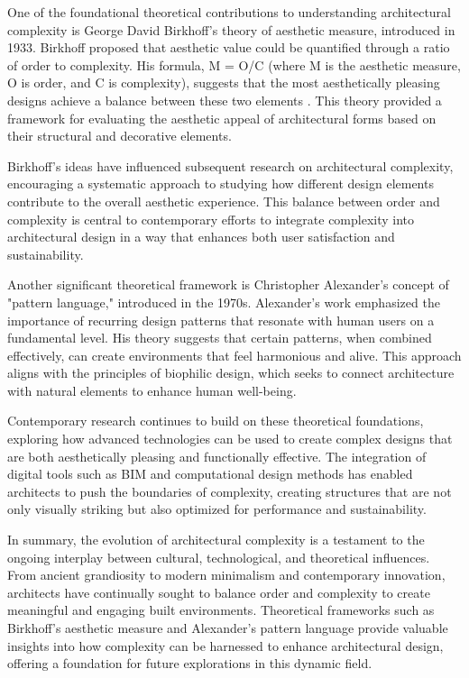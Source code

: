 One of the foundational theoretical contributions to understanding architectural complexity is George David Birkhoff's theory of aesthetic measure, introduced in 1933. Birkhoff proposed that aesthetic value could be quantified through a ratio of order to complexity. His formula, M = O/C (where M is the aesthetic measure, O is order, and C is complexity), suggests that the most aesthetically pleasing designs achieve a balance between these two elements \cite{Birkhoff1933}. This theory provided a framework for evaluating the aesthetic appeal of architectural forms based on their structural and decorative elements.

Birkhoff's ideas have influenced subsequent research on architectural complexity, encouraging a systematic approach to studying how different design elements contribute to the overall aesthetic experience. This balance between order and complexity is central to contemporary efforts to integrate complexity into architectural design in a way that enhances both user satisfaction and sustainability.

Another significant theoretical framework is Christopher Alexander's concept of "pattern language," introduced in the 1970s. Alexander's work emphasized the importance of recurring design patterns that resonate with human users on a fundamental level. His theory suggests that certain patterns, when combined effectively, can create environments that feel harmonious and alive. This approach aligns with the principles of biophilic design, which seeks to connect architecture with natural elements to enhance human well-being.

Contemporary research continues to build on these theoretical foundations, exploring how advanced technologies can be used to create complex designs that are both aesthetically pleasing and functionally effective. The integration of digital tools such as BIM and computational design methods has enabled architects to push the boundaries of complexity, creating structures that are not only visually striking but also optimized for performance and sustainability.

In summary, the evolution of architectural complexity is a testament to the ongoing interplay between cultural, technological, and theoretical influences. From ancient grandiosity to modern minimalism and contemporary innovation, architects have continually sought to balance order and complexity to create meaningful and engaging built environments. Theoretical frameworks such as Birkhoff's aesthetic measure and Alexander's pattern language provide valuable insights into how complexity can be harnessed to enhance architectural design, offering a foundation for future explorations in this dynamic field.


